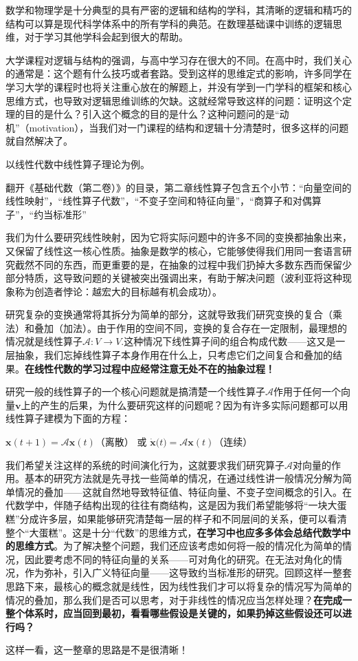 \documentclass{ctexart}
\begin{document}
数学和物理学是十分典型的具有严密的逻辑和结构的学科，其清晰的逻辑和精巧的结构可以算是现代科学体系中的所有学科的典范。在数理基础课中训练的逻辑思维，对于学习其他学科会起到很大的帮助。

大学课程对逻辑与结构的强调，与高中学习存在很大的不同。在高中时，我们关心的通常是：这个题有什么技巧或者套路。受到这样的思维定式的影响，许多同学在学习大学的课程时也将关注重心放在的解题上，并没有学到一门学科的框架和核心思维方式，也导致对逻辑思维训练的欠缺。这就经常导致这样的问题：证明这个定理的目的是什么？引入这个概念的目的是什么？这种问题问的是“动机”（motivation），当我们对一门课程的结构和逻辑十分清楚时，很多这样的问题就自然解决了。


\begin{myexample}
  以线性代数中线性算子理论为例。

  翻开《基础代数（第二卷）》的目录，第二章线性算子包含五个小节：“向量空间的线性映射”，“线性算子代数”，“不变子空间和特征向量”，“商算子和对偶算子”，“约当标准形”

  我们为什么要研究线性映射，因为它将实际问题中的许多不同的变换都抽象出来，又保留了线性这一核心性质。抽象是数学的核心，它能够使得我们用同一套语言研究截然不同的东西，而更重要的是，在抽象的过程中我们扔掉大多数东西而保留少部分特质，这导致问题的关键被突出强调出来，有助于解决问题（波利亚将这种现象称为创造者悖论：越宏大的目标越有机会成功）。

  研究复杂的变换通常将其拆分为简单的部分，这就导致我们研究变换的复合（乘法）和叠加（加法）。由于作用的空间不同，变换的复合存在一定限制，最理想的情况就是线性算子$\mathcal{A}: V \rightarrow V$.这种情况下线性算子间的组合构成代数——这又是一层抽象，我们忘掉线性算子本身作用在什么上，只考虑它们之间复合和叠加的结果。\textbf{在线性代数的学习过程中应经常注意无处不在的抽象过程！}

  研究一般的线性算子的一个核心问题就是搞清楚一个线性算子$\mathcal{A}$作用于任何一个向量$\mathbf{v}$上的产生的后果，为什么要研究这样的问题呢？因为有许多实际问题都可以用线性算子建模为下面的方程：
  \begin{center}
    $\mathbf{x}(t + 1) = \mathcal{A}\mathbf{x}(t)$（离散） 或 $\dot{\mathbf{x}}(t\mathcal{) = A}\mathbf{x}(t)$（连续）
  \end{center}

  我们希望关注这样的系统的时间演化行为，这就要求我们研究算子$\mathcal{A}$对向量的作用。基本的研究方法就是先寻找一些简单的情况，在通过线性讲一般情况分解为简单情况的叠加——这就自然地导致特征值、特征向量、不变子空间概念的引入。在代数学中，伴随子结构出现的往往有商结构，这是因为我们希望能够将“一块大蛋糕”分成许多层，如果能够研究清楚每一层的样子和不同层间的关系，便可以看清整个“大蛋糕”。这是十分“代数”的思维方式，\textbf{在学习中也应多多体会总结代数学中的思维方式}。为了解决整个问题，我们还应该考虑如何将一般的情况化为简单的情况，因此要考虑不同的特征向量的关系——可对角化的研究。在无法对角化的情况，作为弥补，引入广义特征向量——这导致约当标准形的研究。回顾这样一整套思路下来，最核心的概念就是线性，因为线性我们才可以将复杂的情况写为简单的情况的叠加，那么我们是否可以思考，对于非线性的情况应当怎样处理？\textbf{在完成一整个体系时，应当回到最初，看看哪些假设是关键的，如果扔掉这些假设还可以进行吗？}

  这样一看，这一整章的思路是不是很清晰！
\end{myexample}
\end{document}
